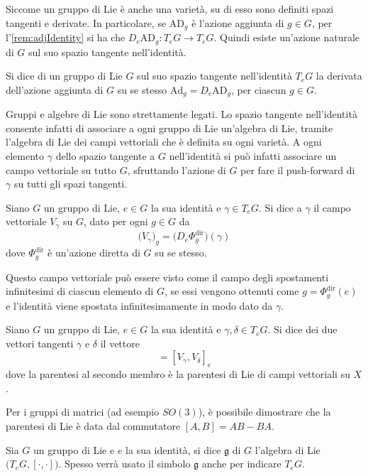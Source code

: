 Siccome un gruppo di Lie è anche una varietà, su di esso sono definiti spazi tangenti e derivate. In particolare, se $\mathrm{AD}_g$ è l'azione aggiunta di $g \in G$, per l'\autoref{rem:adjIdentity} si ha che $D_e \mathrm{AD}_g: T_e G \to T_e G$. Quindi esiste un'azione naturale di $G$ sul suo spazio tangente nell'identità.
\begin{definition}
  Si dice  di un gruppo di Lie $G$ sul suo spazio tangente nell'identità $T_e G$ la derivata dell'azione aggiunta di $G$ su se stesso $\mathrm{Ad}_g = D_e \mathrm{AD}_g$, per ciascun $g \in G$. 
\end{definition}

Gruppi e algebre di Lie sono strettamente legati. Lo spazio tangente nell'identità consente infatti di associare a ogni gruppo di Lie un'algebra di Lie, tramite l'algebra di Lie dei campi vettoriali che è definita su ogni varietà. A ogni elemento $\gamma$ dello spazio tangente a $G$ nell'identità si può infatti associare un campo vettoriale su tutto $G$, sfruttando l'azione di $G$ per fare il push-forward di $\gamma$ su tutti gli spazi tangenti.
\begin{definition}
  Siano $G$ un gruppo di Lie, $e \in G$ la sua identità e $\gamma \in T_e G$. Si dice  a $\gamma$ il campo vettoriale $V_\gamma$ su $G$, dato per ogni $g \in G$ da \begin{equation*}
  \big(V_\gamma\big)_g = \big(D_e \Phi^{\text{dir}}_g\big) (\gamma)
  \end{equation*} 
  dove $\Phi^{\text{dir}}_g$ è un'azione diretta di $G$ su se stesso.
\end{definition}
\begin{remark}
  Questo campo vettoriale può essere visto come il campo degli spostamenti infinitesimi di ciascun elemento di $G$, se essi vengono ottenuti come $g=\Phi^{\text{dir}}_g(e)$ e l'identità viene spostata infinitesimamente in modo dato da $\gamma$.
\end{remark}
\begin{definition}
  Siano $G$ un gruppo di Lie, $e \in G$ la sua identità e $\gamma, \delta \in T_e G$. Si dice  dei due vettori tangenti $\gamma$ e $\delta$ il vettore \begin{equation*}
  [\gamma,\delta] = [V_{\gamma}, V_{\delta}]_e
  \end{equation*} 
  dove la parentesi al secondo membro è la parentesi di Lie di campi vettoriali su $X$.
\end{definition}
\begin{remark} \label{rem:matrixComm}
  Per i gruppi di matrici (ad esempio $SO(3)$), è possibile dimostrare che la parentesi di Lie è data dal commutatore $[A,B] = AB - BA$.
\end{remark}
\begin{definition}
  Sia $G$ un gruppo di Lie e $e$ la sua identità, si dice  $\mathfrak{g}$ di $G$ l'algebra di Lie $\big(T_e G, [\cdot ,\cdot ]\big)$. Spesso verrà usato il simbolo $\mathfrak{g}$ anche per indicare $T_e G$.
\end{definition}

